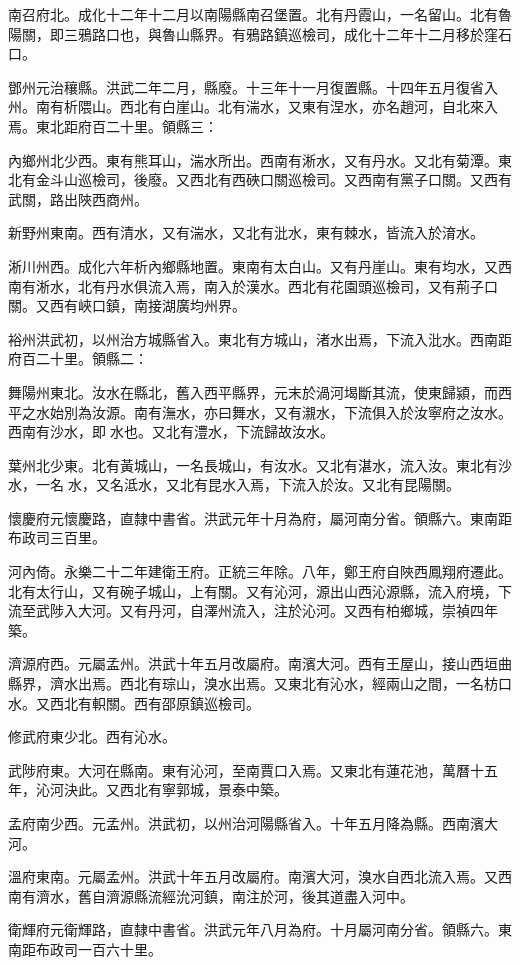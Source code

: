 南召府北。成化十二年十二月以南陽縣南召堡置。北有丹霞山，一名留山。北有魯陽關，即三鴉路口也，與魯山縣界。有鴉路鎮巡檢司，成化十二年十二月移於窪石口。

鄧州元治穰縣。洪武二年二月，縣廢。十三年十一月復置縣。十四年五月復省入州。南有析隈山。西北有白崖山。北有湍水，又東有涅水，亦名趙河，自北來入焉。東北距府百二十里。領縣三：

內鄉州北少西。東有熊耳山，湍水所出。西南有淅水，又有丹水。又北有菊潭。東北有金斗山巡檢司，後廢。又西北有西硤口關巡檢司。又西南有黨子口關。又西有武關，路出陜西商州。

新野州東南。西有清水，又有湍水，又北有沘水，東有棘水，皆流入於淯水。

淅川州西。成化六年析內鄉縣地置。東南有太白山。又有丹崖山。東有均水，又西南有淅水，北有丹水俱流入焉，南入於漢水。西北有花園頭巡檢司，又有荊子口關。又西有峽口鎮，南接湖廣均州界。

裕州洪武初，以州治方城縣省入。東北有方城山，渚水出焉，下流入沘水。西南距府百二十里。領縣二：

舞陽州東北。汝水在縣北，舊入西平縣界，元末於渦河堨斷其流，使東歸潁，而西平之水始別為汝源。南有潕水，亦曰舞水，又有瀙水，下流俱入於汝寧府之汝水。西南有沙水，即水也。又北有澧水，下流歸故汝水。

葉州北少東。北有黃城山，一名長城山，有汝水。又北有湛水，流入汝。東北有沙水，一名水，又名泜水，又北有昆水入焉，下流入於汝。又北有昆陽關。

懷慶府元懷慶路，直隸中書省。洪武元年十月為府，屬河南分省。領縣六。東南距布政司三百里。

河內倚。永樂二十二年建衛王府。正統三年除。八年，鄭王府自陜西鳳翔府遷此。北有太行山，又有碗子城山，上有關。又有沁河，源出山西沁源縣，流入府境，下流至武陟入大河。又有丹河，自澤州流入，注於沁河。又西有柏鄉城，崇禎四年築。

濟源府西。元屬孟州。洪武十年五月改屬府。南濱大河。西有王屋山，接山西垣曲縣界，濟水出焉。西北有琮山，溴水出焉。又東北有沁水，經兩山之間，一名枋口水。又西北有軹關。西有邵原鎮巡檢司。

修武府東少北。西有沁水。

武陟府東。大河在縣南。東有沁河，至南賈口入焉。又東北有蓮花池，萬曆十五年，沁河決此。又西北有寧郭城，景泰中築。

孟府南少西。元孟州。洪武初，以州治河陽縣省入。十年五月降為縣。西南濱大河。

溫府東南。元屬孟州。洪武十年五月改屬府。南濱大河，溴水自西北流入焉。又西南有濟水，舊自濟源縣流經沇河鎮，南注於河，後其道盡入河中。

衛輝府元衛輝路，直隸中書省。洪武元年八月為府。十月屬河南分省。領縣六。東南距布政司一百六十里。

